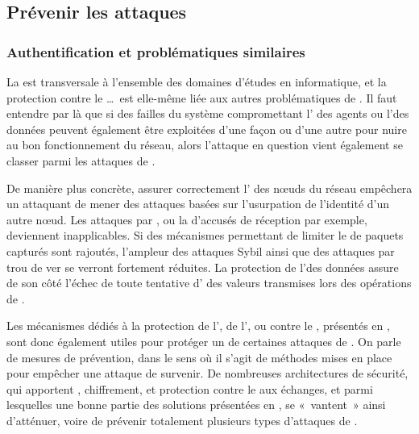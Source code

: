 \subsection{Prévenir les attaques}

    \subsubsection{Authentification et problématiques similaires}
La \secu est transversale à l'ensemble des domaines d'études en informatique, et la protection contre le \dds\dots\ est elle-même liée aux autres problématiques de \secu.
Il faut entendre par là que si des failles du système compromettant l' des agents ou l'\integrite des données peuvent également être exploitées d'une façon ou d'une autre pour nuire au bon fonctionnement du réseau, alors l'attaque en question vient également se classer parmi les attaques de \dds.

De manière plus concrète, assurer correctement l' des nœuds du réseau empêchera un attaquant de mener des attaques basées sur l'usurpation de l'identité d'un autre nœud.
Les attaques par \desync, ou la  d'accusés de réception par exemple, deviennent inapplicables.
Si des mécanismes permettant de limiter le  de paquets capturés sont rajoutés, l'ampleur des attaques Sybil ainsi que des attaques par trou de ver se verront fortement réduites.
La protection de l'\integrite des données assure de son côté l'échec de toute tentative d' des valeurs transmises lors des opérations de .

Les mécanismes dédiés à la protection de l', de l'\integrite, ou contre le , présentés en , sont donc également utiles pour protéger un \rc de certaines attaques de \dds.
On parle de mesures de prévention, dans le sens où il s'agit de méthodes mises en place pour empêcher une attaque de survenir.
De nombreuses architectures de sécurité, qui apportent , chiffrement, \integrite et protection contre le  aux échanges, et parmi lesquelles une bonne partie des solutions présentées en , se « vantent » ainsi d'atténuer, voire de prévenir totalement plusieurs types d'attaques de \dds.

